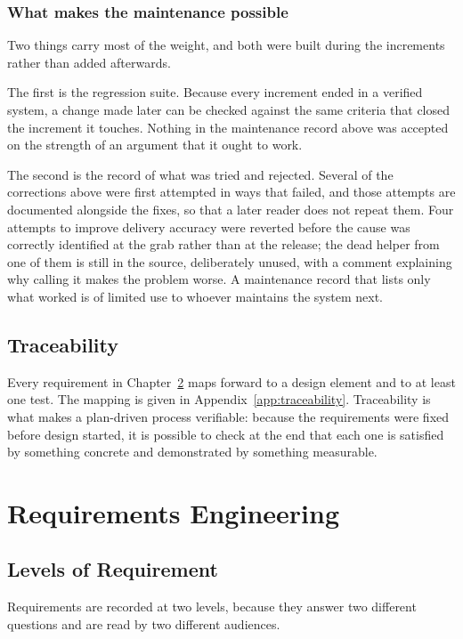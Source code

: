 \documentclass[12pt,a4paper]{report}
\begin{document}
\subsection*{What makes the maintenance possible}
Two things carry most of the weight, and both were built during the increments rather than added
afterwards.

The first is the regression suite. Because every increment ended in a verified system, a change
made later can be checked against the same criteria that closed the increment it touches. Nothing
in the maintenance record above was accepted on the strength of an argument that it ought to work.

The second is the record of what was tried and rejected. Several of the corrections above were
first attempted in ways that failed, and those attempts are documented alongside the fixes, so that
a later reader does not repeat them. Four attempts to improve delivery accuracy were reverted before
the cause was correctly identified at the grab rather than at the release; the dead helper from one
of them is still in the source, deliberately unused, with a comment explaining why calling it makes
the problem worse. A maintenance record that lists only what worked is of limited use to whoever
maintains the system next.

\section{Traceability}
Every requirement in Chapter~\ref{ch:requirements} maps forward to a design element and to at
least one test. The mapping is given in Appendix~\ref{app:traceability}. Traceability is what makes
a plan-driven process verifiable: because the requirements were fixed before design started, it is
possible to check at the end that each one is satisfied by something concrete and demonstrated by
something measurable.

\chapter{Requirements Engineering}
\label{ch:requirements}

\section{Levels of Requirement}
Requirements are recorded at two levels, because they answer two different questions and are read
by two different audiences.
\end{document}
